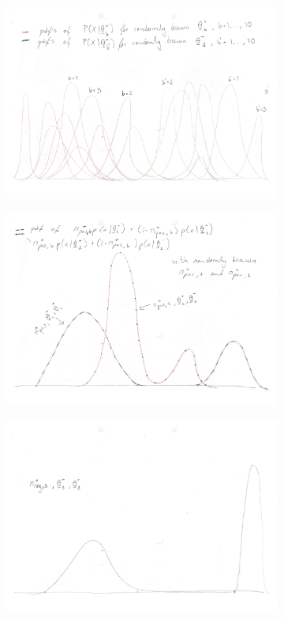 \begin{figure}[!h]
  \centering
  \begin{subfigure}{}
    \includegraphics[height = 0.3\textheight]{Figures/distrs.pdf}
  \end{subfigure}    
  \begin{subfigure}{}
    \includegraphics[height = 0.3\textheight]{Figures/pos.pdf}
  \end{subfigure}
  \begin{subfigure}{}
    \includegraphics[height = 0.3\textheight]{Figures/neg.pdf}
  \end{subfigure}
\end{figure}

